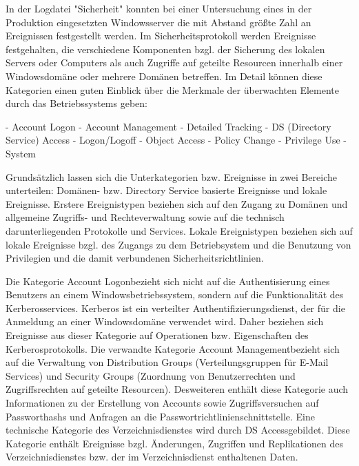 In der Logdatei "Sicherheit" konnten bei einer Untersuchung eines in der Produktion eingesetzten Windowsserver die mit Abstand größte Zahl an Ereignissen festgestellt werden. Im Sicherheitsprotokoll werden Ereignisse festgehalten, die verschiedene Komponenten bzgl. der Sicherung des lokalen Servers oder Computers als auch Zugriffe auf geteilte Resourcen innerhalb einer Windowsdomäne oder mehrere Domänen betreffen. Im Detail können diese Kategorien einen guten Einblick über die Merkmale der überwachten Elemente durch das Betriebssystems geben:
\begin{itemize}
- Account Logon
- Account Management
- Detailed Tracking
- DS (Directory Service) Access
- Logon/Logoff
- Object Access
- Policy Change
- Privilege Use
- System
\end{itemize}
Grundsätzlich lassen sich die Unterkategorien bzw. Ereignisse in zwei Bereiche unterteilen: Domänen- bzw. Directory Service basierte Ereignisse und lokale Ereignisse. Erstere Ereignistypen beziehen sich auf den Zugang zu Domänen und allgemeine Zugriffs- und Rechteverwaltung sowie auf die technisch darunterliegenden Protokolle und Services. Lokale Ereignistypen beziehen sich auf lokale Ereignisse bzgl. des Zugangs zu dem Betriebsystem und die Benutzung von Privilegien und die damit verbundenen Sicherheitsrichtlinien.

Die Kategorie \glqq Account Logon\grqq bezieht sich nicht auf die Authentisierung eines Benutzers an einem Windowsbetriebssystem, sondern auf die Funktionalität des Kerberosservices. Kerberos ist ein verteilter Authentifizierungsdienst, der für die Anmeldung an einer Windowsdomäne verwendet wird.  Daher beziehen sich Ereignisse aus dieser Kategorie auf Operationen bzw. Eigenschaften des Kerberosprotokolls. Die verwandte Kategorie \glqq Account Management\grqq bezieht sich auf die Verwaltung von Distribution Groups (Verteilungsgruppen für E-Mail Services) und Security Groups (Zuordnung von Benutzerrechten und Zugriffsrechten auf geteilte Resourcen). Desweiteren enthält diese Kategorie auch Informationen zu der Erstellung von Accounts sowie Zugriffsversuchen auf Passworthashs und Anfragen an die Passwortrichtlinienschnittstelle. 
Eine technische Kategorie des Verzeichnisdienstes wird durch \glqq DS Access\grqq gebildet. Diese Kategorie enthält Ereignisse bzgl. Änderungen, Zugriffen und Replikationen des Verzeichnisdienstes bzw. der im Verzeichnisdienst enthaltenen Daten.

